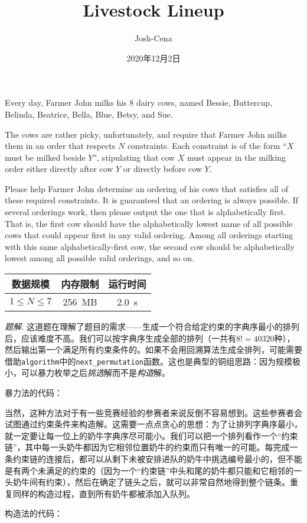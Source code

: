 \documentclass[UTF8,12pt]{ctexart}
\title{Livestock Lineup}
\author{Josh-Cena}
\date{2020年12月2日}
\begin{document}
\maketitle
\begin{mdframed}[style=Question]
    Every day, Farmer John milks his 8 dairy cows, named Bessie, Buttercup, Belinda, Beatrice, Bella, Blue, Betsy, and Sue.

    The cows are rather picky, unfortunately, and require that Farmer John milks them in an order that respects $N$ constraints. Each constraint is of the form ``$X$ must be milked beside $Y$'', stipulating that cow $X$ must appear in the milking order either directly after cow $Y$ or directly before cow $Y$.

    Please help Farmer John determine an ordering of his cows that satisfies all of these required constraints. It is guaranteed that an ordering is always possible. If several orderings work, then please output the one that is alphabetically first. That is, the first cow should have the alphabetically lowest name of all possible cows that could appear first in any valid ordering. Among all orderings starting with this same alphabetically-first cow, the second cow should be alphabetically lowest among all possible valid orderings, and so on.

    \begin{table}[H]
        \centering
        \begin{tabular}{|c|c|c|}\hline
            数据规模&内存限制&运行时间\\\hline
            $1\le N\le 7$&\SI{256}{MB}&\SI{2.0}{s}\\\hline
        \end{tabular}
    \end{table}
\end{mdframed}
\textit{题解.} 这道题在理解了题目的需求——生成一个符合给定约束的字典序最小的排列后，应该难度不高。我们可以按字典序生成全部的排列（一共有$8!=40320$种），然后输出第一个满足所有约束条件的。如果不会用回溯算法生成全排列，可能需要借助\texttt{algorithm}中的\texttt{next\_permutation}函数。这也是典型的铜组思路：因为规模极小，可以暴力枚举之后\textit{挑选}解而不是\textit{构造}解。

暴力法的代码：



当然，这种方法对于有一些竞赛经验的参赛者来说反倒不容易想到。这些参赛者会试图通过约束条件来构造解。这需要一点点贪心的思想：为了让排列字典序最小，就一定要让每一位上的奶牛字典序尽可能小。我们可以把一个排列看作一个“约束链”，其中每一头奶牛都因为它相邻位置奶牛的约束而只有唯一的可能。每完成一条约束链的连接后，都可以从剩下未被安排进队的奶牛中挑选编号最小的，但不能是有两个未满足的约束的（因为一个“约束链”中头和尾的奶牛都只能和它相邻的一头奶牛间有约束），然后在确定了链头之后，就可以非常自然地得到整个链条。重复同样的构造过程，直到所有奶牛都被添加入队列。

构造法的代码：


\end{document}
